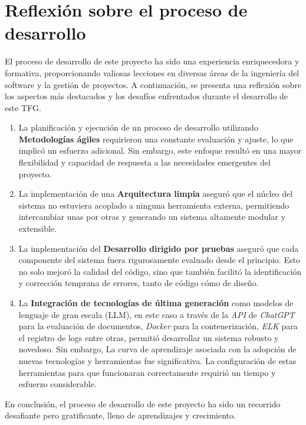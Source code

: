 \section{Reflexión sobre el proceso de desarrollo}

El proceso de desarrollo de este proyecto ha sido una experiencia enriquecedora y formativa, proporcionando valiosas
lecciones en diversas áreas de la ingeniería del software y la gestión de proyectos.
A continuación, se presenta una reflexión sobre los aspectos más destacados y los desafíos enfrentados durante el
desarrollo de este TFG.

\begin{enumerate}
    \item
    La planificación y ejecución de un proceso de desarrollo utilizando \textbf{Metodologías ágiles} requirieron una
    constante evaluación y ajuste, lo que implicó un esfuerzo adicional.
    Sin embargo, este enfoque resultó en una mayor flexibilidad y capacidad de respuesta a las necesidades emergentes
    del proyecto.
    \item
    La implementación de una \textbf{Arquitectura limpia}
    aseguró que el núcleo del sistema no estuviera acoplado a ninguna herramienta externa, permitiendo intercambiar unas
    por otras y generando un sistema altamente modular y extensible.
    \item
    La implementación del \textbf{Desarrollo dirigido por pruebas} aseguró que cada componente del sistema fuera
    rigurosamente evaluado desde el principio.
    Esto no solo mejoró la calidad del código, sino que también facilitó la identificación y corrección temprana de
    errores, tanto de código cómo de diseño.
    \item
    La \textbf{Integración de tecnologías de última generación} como modelos de lenguaje de gran escala (LLM), en este
    caso a través de la \textit{API} de \textit{ChatGPT} para la evaluación de documentos, \textit{Docker}
    para la contenerización, \textit{ELK} para el registro de logs entre otras, permitió desarrollar un sistema
    robusto y novedoso.
    Sin embargo, La curva de aprendizaje asociada con la adopción de nuevas tecnologías y herramientas fue
    significativa.
    La configuración de estas herramientas para que funcionaran correctamente requirió un tiempo y esfuerzo
    considerable.
\end{enumerate}

En conclusión, el proceso de desarrollo de este proyecto ha sido un recorrido desafiante pero gratificante, lleno de
aprendizajes y crecimiento.
